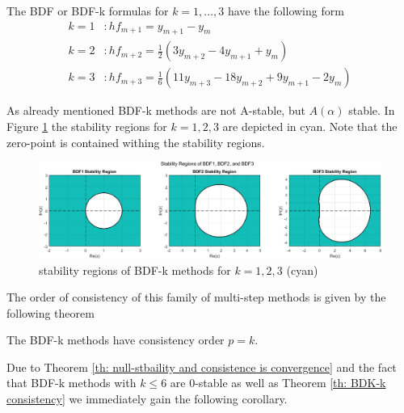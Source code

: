 	The BDF or BDF-k formulas for $k=1,...,3$ have the following form %
	\begin{align*}
		k = 1 &: h f_{m+1} = y_{m+1} - y_m \\
		k = 2 &: h f_{m+2} = \frac{1}{2} (3 y_{m+2} - 4 y_{m+1} + y_m) \\
		k = 3 &: h f_{m+3} = \frac{1}{6} (11 y_{m+3} - 18 y_{m+2} + 9 y_{m+1} - 2 y_m) %
	\end{align*}
		
	As already mentioned BDF-k methods are not A-stable, but $A(\alpha)$ stable. In Figure \ref{fig:bdf-k stability regions} the stability regions for $k=1,2,3$ are depicted in cyan. Note that the zero-point is contained withing the stability regions.
		
	\begin{figure}[H]
		\centering
		\includegraphics[width=1\linewidth]{pictures/bdf_stability_regions.png}
		\caption{stability regions of BDF-k methods for $k=1,2,3$ (cyan)}
		\label{fig:bdf-k stability regions}
	\end{figure}

	The order of consistency of this family of multi-step methods is given by the following theorem
	
	\begin{theorem}
		\label{th: BDK-k consistency}
		The BDF-k methods have consistency order $p=k$.
	\end{theorem}
	
	Due to Theorem \ref{th: null-stbaility and consistence is convergence} and the fact that BDF-k methods with $k \leq 6$  are $0$-stable as well as Theorem \ref{th: BDK-k consistency} we immediately gain the following corollary.
	
